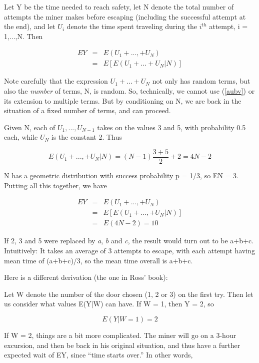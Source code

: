 \documentclass[11pt]{article}
\begin{document}
Let Y be the time needed to reach safety, let N denote the total
number of attempts the miner makes before escaping (including the
successful attempt at the end), and let $U_i$ denote the time spent
traveling during the $i^{th}$ attempt, i = 1,...,N.  Then

\begin{eqnarray}
EY &=& E(U_1+...,+U_N) \\ 
&=& E \left [ E(U_1+...+U_N | N) \right ] 
\end{eqnarray}

Note carefully that the expression $U_1+...+U_N$ not only has random
terms, but also the {\it number} of terms, N, is random.  So,
technically, we cannot use (\ref{aubv}) or its extension to multiple
terms.  But by conditioning on N, we are back in the situation of a
fixed number of terms, and can proceed.

Given N, each of $U_1,...,U_{N-1}$ takes on the values 3 and 5, with
probability 0.5 each, while $U_N$ is the constant 2.  Thus

\begin{equation}
E(U_1+...,+U_N | N) = (N-1) \frac{3+5}{2} + 2 = 4N - 2
\end{equation}

N has a geometric distribution with success probability p = 1/3, so EN =
3.  Putting all this together, we have

\begin{eqnarray}
EY &=& E(U_1+...,+U_N) \\
&=& E\left [ E(U_1+...,+U_N | N) \right ] \\
&=& E(4N - 2) = 10
\end{eqnarray}

If 2, 3 and 5 were replaced by {\it a}, {\it b} and {\it c}, the result
would turn out to be a+b+c.  Intuitively:  It takes an average of 3
attempts to escape, with each attempt having mean time of (a+b+c)/3, so
the mean time overall is a+b+c.

Here is a different derivation (the one in Ross' book):

Let W denote the number of the door chosen (1, 2 or 3) on the first try.
Then let us consider what values E(Y$|$W) can have. If W = 1, then Y =
2, so

\begin{equation}
E(Y|W=1)=2
\end{equation}

If W = 2, things are a bit more complicated. The miner will go on a
3-hour excursion, and then be back in his original situation, and thus
have a further expected wait of EY, since ``time starts over.''  In
other words,
\end{document}

